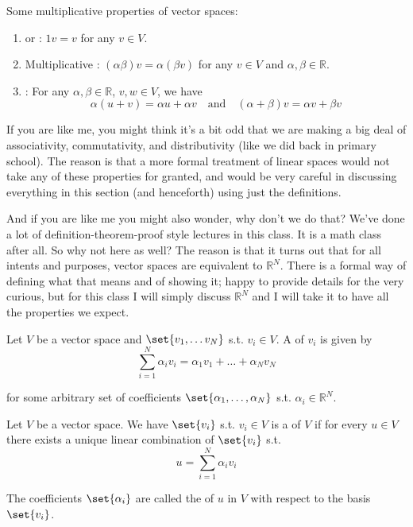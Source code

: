 \documentclass{article}
\begin{document}
Some multiplicative properties of vector spaces:
\begin{enumerate}
  \item {} or : $1 v = v$ for any $v \in V$.
  \item Multiplicative : $(\alpha \beta) v = \alpha (\beta v)$ for any $v \in V$ and $\alpha, \beta \in \mathbb{R}$.
  \item {}: For any $\alpha, \beta \in \mathbb{R}$, $v, w \in V$, we have
    \[
      \alpha (u + v) = \alpha u + \alpha v
      \quad
      \text{and}
      \quad
      (\alpha + \beta) v = \alpha v + \beta v
    \]
\end{enumerate}

\begin{remark}
  If you are like me, you might think it's a bit odd that we are making a big deal of associativity, commutativity, and distributivity (like we did back in primary school). The reason is that a more formal treatment of linear spaces would not take any of these properties for granted, and would be very careful in discussing everything in this section (and henceforth) using just the definitions.

  And if you are like me you might also wonder, why don't we do that? We've done a lot of definition-theorem-proof style lectures in this class. It is a math class after all. So why not here as well? The reason is that it turns out that for all intents and purposes, vector spaces are equivalent to $\mathbb{R}^N$. There is a formal way of defining what that means and of showing it; happy to provide details for the very curious, but for this class I will simply discuss $\mathbb{R}^N$ and I will take it to have all the properties we expect.
\end{remark}

\begin{definition}
  Let $V$ be a vector space and $\set{v_1, \ldots v_N}$ s.t. $v_i \in V$. A  of $v_i$ is given by
  \[
    \sum^{N}_{i = 1} \alpha_i v_i = \alpha_1 v_1 + \ldots + \alpha_N v_N
  \]

  for some arbitrary set of coefficients $\set{\alpha_1, \ldots, \alpha_N}$ s.t. $\alpha_i \in \mathbb{R}^N$.
\end{definition}

\begin{definition}
  Let $V$ be a vector space. We have $\set{v_i}$ s.t. $v_i \in V$ is a  of $V$ if for every $u \in V$ there exists a unique linear combination of $\set{v_i}$ s.t.
  \[
    u = \sum^{N}_{i = 1} \alpha_i v_i
  \]

  The coefficients $\set{\alpha_i}$ are called the  of $u$ in $V$ with respect to the basis $\set{v_i}$.
\end{definition}
\end{document}
